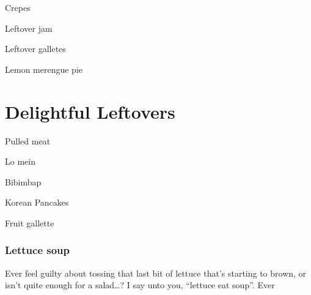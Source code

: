 \documentclass[
]{book}
\begin{document}
Crepes

Leftover jam

Leftover galletes

Lemon merengue pie

\hypertarget{delightful-leftovers}{%
\chapter*{Delightful Leftovers}\label{delightful-leftovers}}

Pulled meat

Lo mein

Bibimbap

Korean Pancakes

Fruit gallette

\hypertarget{lettuce-soup}{%
\subsection*{Lettuce soup}\label{lettuce-soup}}

Ever feel guilty about tossing that last bit of lettuce that's starting to brown, or isn't quite enough for a salad\ldots? I say unto you, ``lettuce eat soup''.
Ever

  
\end{document}
